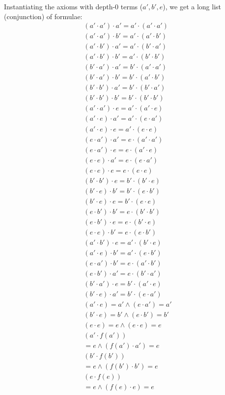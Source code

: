 \documentclass[12pt,letterpaper, onecolumn]{exam}
\begin{document}
\begin{questions}
	Instantiating the axioms with depth-0 terms ($a', b', e$), we get a long list (conjunction) of formulae:
	\begin{align*}
		(a' \cdot a') \cdot a' = a' \cdot (a' \cdot a') \\
		(a' \cdot a') \cdot b' = a' \cdot (a' \cdot b') \\
		(a' \cdot b') \cdot a' = a' \cdot (b' \cdot a') \\
		(a' \cdot b') \cdot b' = a' \cdot (b' \cdot b') \\
		(b' \cdot a') \cdot a' = b' \cdot (a' \cdot a') \\
		(b' \cdot a') \cdot b' = b' \cdot (a' \cdot b') \\
		(b' \cdot b') \cdot a' = b' \cdot (b' \cdot a') \\
		(b' \cdot b') \cdot b' = b' \cdot (b' \cdot b') \\ %
		(a' \cdot a') \cdot e = a' \cdot (a' \cdot e) \\
		(a' \cdot e) \cdot a' = a' \cdot (e \cdot a') \\
		(a' \cdot e) \cdot e = a' \cdot (e \cdot e) \\
		(e \cdot a') \cdot a' = e \cdot (a' \cdot a') \\
		(e \cdot a') \cdot e = e \cdot (a' \cdot e) \\
		(e \cdot e) \cdot a' = e \cdot (e \cdot a') \\
		(e \cdot e) \cdot e = e \cdot (e \cdot e) \\  %
		(b' \cdot b') \cdot e = b' \cdot (b' \cdot e) \\
		(b' \cdot e) \cdot b' = b' \cdot (e \cdot b') \\
		(b' \cdot e) \cdot e = b' \cdot (e \cdot e) \\
		(e \cdot b') \cdot b' = e \cdot (b' \cdot b') \\
		(e \cdot b') \cdot e = e \cdot (b' \cdot e) \\
		(e \cdot e) \cdot b' = e \cdot (e \cdot b') \\ %
		(a' \cdot b') \cdot e = a' \cdot (b' \cdot e) \\
		(a' \cdot e) \cdot b' = a' \cdot (e \cdot b') \\
		(e \cdot a') \cdot b' = e \cdot (a' \cdot b') \\
		(e \cdot b') \cdot a' = e \cdot (b' \cdot a') \\
		(b' \cdot a') \cdot e = b' \cdot (a' \cdot e) \\
		(b' \cdot e) \cdot a' = b' \cdot (e \cdot a') \\ %
		(a' \cdot e) = a' \land (e \cdot a') = a' \\
		(b' \cdot e) = b' \land (e \cdot b') = b' \\
		(e \cdot e) = e \land (e \cdot e) = e \\ %
		(a' \cdot f(a'))  \\ = e \land (f(a') \cdot a') = e \\
		(b' \cdot f(b'))  \\ = e \land (f(b') \cdot b') = e \\
		(e \cdot f(e))  \\ = e \land (f(e) \cdot e) = e
	\end{align*}


\end{questions}
\end{document}
